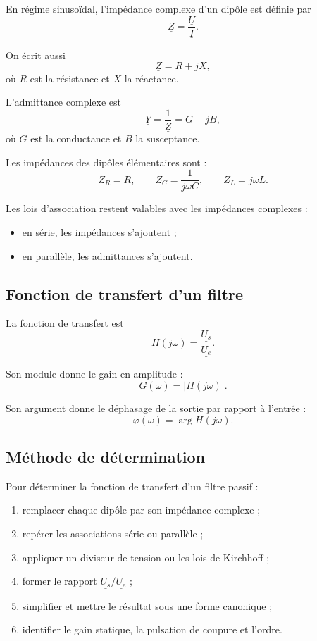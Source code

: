En régime sinusoïdal, l'impédance complexe d'un dipôle est définie par
\[
\underline{Z}=\frac{\underline{U}}{\underline{I}}.
\]

On écrit aussi
\[
\underline{Z}=R+jX,
\]
où $R$ est la résistance et $X$ la réactance.

L'admittance complexe est
\[
\underline{Y}=\frac{1}{\underline{Z}}=G+jB,
\]
où $G$ est la conductance et $B$ la susceptance.

Les impédances des dipôles élémentaires sont :
\[
\underline{Z_R}=R,
\qquad
\underline{Z_C}=\frac{1}{j\omega C},
\qquad
\underline{Z_L}=j\omega L.
\]

Les lois d'association restent valables avec les impédances complexes :
\begin{itemize}
  \item en série, les impédances s'ajoutent ;
  \item en parallèle, les admittances s'ajoutent.
\end{itemize}

\subsection{Fonction de transfert d'un filtre}

La fonction de transfert est
\[
H(j\omega)=\frac{\underline{U_s}}{\underline{U_e}}.
\]

Son module donne le gain en amplitude :
\[
G(\omega)=|H(j\omega)|.
\]

Son argument donne le déphasage de la sortie par rapport à l'entrée :
\[
\varphi(\omega)=\arg H(j\omega).
\]

\subsection{Méthode de détermination}

Pour déterminer la fonction de transfert d'un filtre passif :
\begin{enumerate}
  \item remplacer chaque dipôle par son impédance complexe ;
  \item repérer les associations série ou parallèle ;
  \item appliquer un diviseur de tension ou les lois de Kirchhoff ;
  \item former le rapport $\underline{U_s}/\underline{U_e}$ ;
  \item simplifier et mettre le résultat sous une forme canonique ;
  \item identifier le gain statique, la pulsation de coupure et l'ordre.
\end{enumerate}

